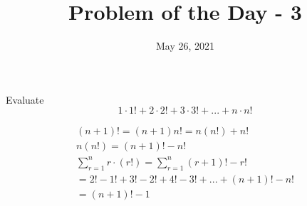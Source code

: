 \documentclass[answers]{exam}
\title{Problem of the Day - 3}
\date{May 26, 2021}
\begin{document}
	\maketitle
	\begin{questions}
		\question
		Evaluate \begin{equation*}1 \cdot 1! + 2 \cdot 2! + 3 \cdot 3! + ... + n \cdot n!\end{equation*}
		\begin{solution}
			\begin{gather*}
				(n+1)! = (n+1)n! = n(n!) + n! \\
				n(n!) = (n+1)! - n! \\
				\sum_{r=1}^{n} r \cdot (r!) = \sum_{r=1}^{n} (r+1)! - r! \\
				= 2! - 1! + 3! - 2! + 4! - 3! + ... + (n+1)! - n! \\
				= (n + 1)! -1
			\end{gather*}
		\end{solution}
	\end{questions}
\end{document}
